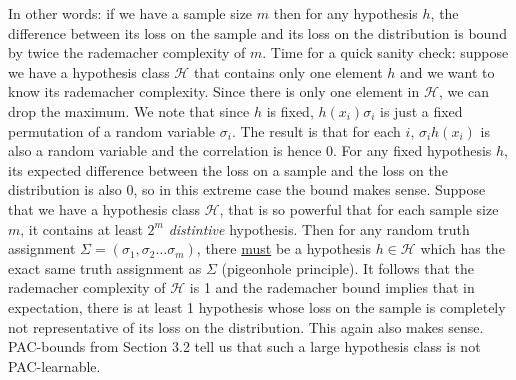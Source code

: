 \documentclass{bigdata}
\begin{document}
In other words: if we have a sample size $m$ then for any hypothesis $h$, the difference between its loss on the sample and its loss on the distribution is bound by twice the rademacher complexity of $m$. 
Time for a quick sanity check: suppose we have a hypothesis class $\mathcal{H}$ that contains only one element $h$ and we want to know its rademacher complexity. Since there is only one element in $\mathcal{H}$, we can drop the maximum. We note that since $h$ is fixed, $h(x_i)\sigma_i$ is just a fixed permutation of a random variable $\sigma_i$. The result is that for each $i$, $\sigma_ih(x_i)$ is also a random variable and the correlation is hence $0$. For any fixed hypothesis $h$, its expected difference between the loss on a sample and the loss on the distribution is also $0$, so in this extreme case the bound makes sense. Suppose that we have a hypothesis class $\mathcal{H}$, that is so powerful that for each sample size $m$, it contains at least $2^m$ \emph{distintive} hypothesis. Then for any random truth assignment $\Sigma = (\sigma_1, \sigma_2 \dots \sigma_m)$, there \underline{must} be a hypothesis $h \in \mathcal{H}$ which has the exact same truth assignment as $\Sigma$ (pigeonhole principle). It follows that the rademacher complexity of $\mathcal{H}$ is 1 and the rademacher bound implies that in expectation, there is at least 1 hypothesis whose loss on the sample is completely not representative of its loss on the distribution. This again also makes sense. PAC-bounds from Section 3.2 tell us that such a large hypothesis class is not PAC-learnable. 
\end{document}
